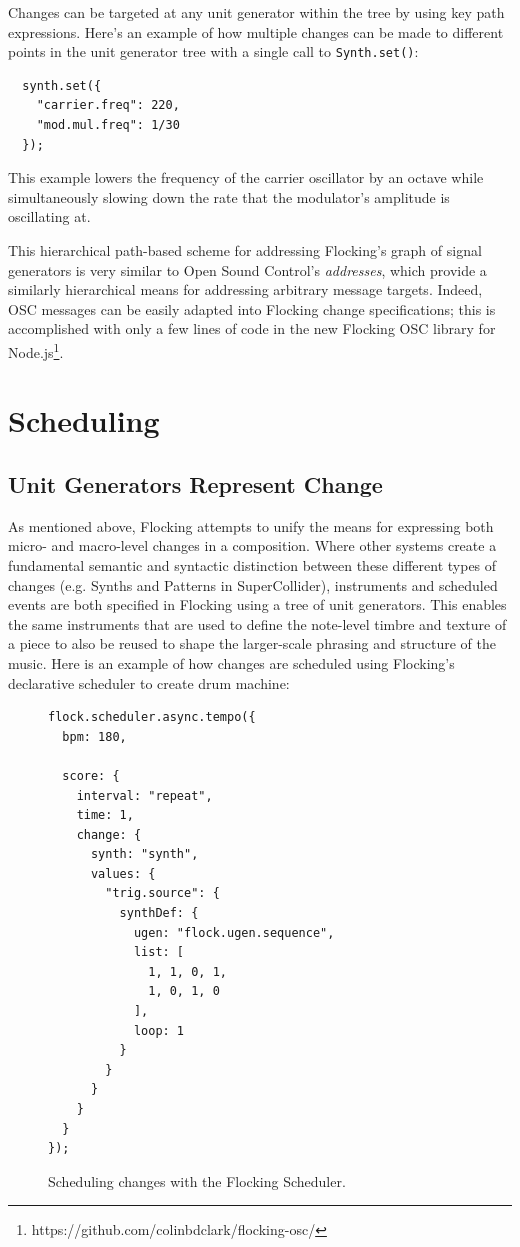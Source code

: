 \documentclass{article}
\begin{document}
Changes can be targeted at any unit generator within the tree by using key path expressions. Here's an example of how multiple changes can be made to different points in the unit generator tree with a single call to \verb|Synth.set()|:

\begin{verbatim}
  synth.set({
    "carrier.freq": 220,
    "mod.mul.freq": 1/30
  });
\end{verbatim}

This example lowers the frequency of the carrier oscillator by an octave while simultaneously slowing down the rate that the modulator's amplitude is oscillating at.

This hierarchical path-based scheme for addressing Flocking's graph of signal generators is very similar to Open Sound Control's {\it addresses}, which provide a similarly hierarchical means for addressing arbitrary message targets. Indeed, OSC messages can be easily adapted into Flocking change specifications; this is accomplished with only a few lines of code in the new Flocking OSC library for Node.js\footnote{https://github.com/colinbdclark/flocking-osc/}.

\section{Scheduling} \label{sec:Scheduling}

\subsection{Unit Generators Represent Change}

As mentioned above, Flocking attempts to unify the means for expressing both micro- and macro-level changes in a composition. Where other systems create a fundamental semantic and syntactic distinction between these different types of changes (e.g. Synths and Patterns in SuperCollider), instruments and scheduled events are both specified in Flocking using a tree of unit generators. This enables the same instruments that are used to define the note-level timbre and texture of a piece to also be reused to shape the larger-scale phrasing and structure of the music. Here is an example of how changes are scheduled using Flocking's declarative scheduler to create drum machine:

\begin{figure}[h!]
    \begin{verbatim}
flock.scheduler.async.tempo({
  bpm: 180,

  score: {
    interval: "repeat",
    time: 1,
    change: {
      synth: "synth",
      values: {
        "trig.source": {
          synthDef: {
            ugen: "flock.ugen.sequence",
            list: [
              1, 1, 0, 1,
              1, 0, 1, 0
            ],
            loop: 1
          }
        }
      }
    }
  }
});
    \end{verbatim}
    \caption{Scheduling changes with the Flocking Scheduler.\label{fig:schedulerEx}}
\end{figure}
\end{document}
